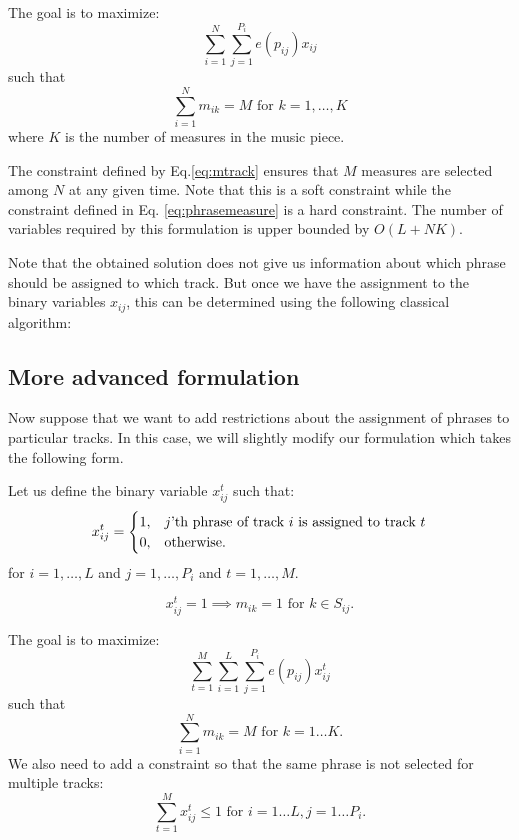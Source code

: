 \documentclass[11pt,a4paper]{article}
\begin{document}
 The goal is to maximize:
 \begin{equation}
 \sum_{i=1}^N\sum_{j=1}^{P_i} e(p_{ij})x_{ij}
 \end{equation}
 such that
 \begin{equation}\label{eq:mtrack}
\sum_{i=1}^N m_{ik} = M \mbox{ for }k=1,\dots, K 
\end{equation}
 where $K$ is the number of measures in the music piece. 
 
 The constraint defined by Eq.\eqref{eq:mtrack} ensures that $M$ measures are selected among $ N $ at any given time. Note that this is a soft constraint while the constraint defined in Eq. \ref{eq:phrasemeasure} is a hard constraint. The number of variables required by this formulation is upper bounded by $ O(L+NK) $.
 
 Note that the obtained solution does not give us information about which phrase should be assigned to which track. But once we have the assignment to the binary variables $ x_{ij} $, this can be determined using the following classical algorithm:
 
 \subsection{More advanced formulation}
 
 Now suppose that we want to add restrictions about the assignment of phrases to particular tracks. In this case, we will slightly modify our formulation which takes the following form.
 
  Let us define the binary variable $x_{ij}^t$ such that:
 \begin{equation}
 x_{ij}^t =   \begin{cases}%
 1,      & \text{$j$'th phrase of track $i$ is assigned to track $ t $}\\
 0, & \text{otherwise.}
 \end{cases}
 \end{equation}
 for $ i = 1, \dots ,L $ and $ j=1, \dots ,P_i  $ and $ t = 1, \dots, M $.
 
\begin{equation}
 x_{ij}^t = 1 \implies m_{ik}=1 \mbox{ for } k \in S_{ij}.
 \end{equation}

 The goal is to maximize:
 \begin{equation}
 \sum_{t=1}^M \sum_{i=1}^L\sum_{j=1}^{P_i} e(p_{ij})x_{ij}^t
 \end{equation}
 such that
 \begin{equation}
 \sum_{i=1}^N m_{ik} = M \mbox{ for }k=1\dots K. 
 \end{equation} 
 We also need to add a constraint so that the same phrase is not selected for multiple tracks:
  \begin{equation}
 \sum_{t=1}^M x_{ij}^t \leq 1 \mbox{ for }i=1\dots L, j=1 \dots P_i. 
 \end{equation}
 
\end{document}
